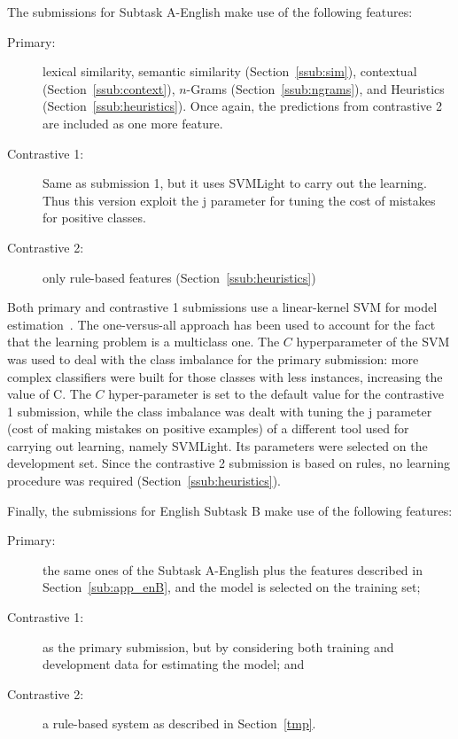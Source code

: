 The submissions for Subtask A-English make use of the following features: 
\begin{description}
\item[Primary:] 
  lexical similarity, semantic similarity (Section~\ref{ssub:sim}), contextual 
  (Section~\ref{ssub:context}), $n$-Grams (Section~\ref{ssub:ngrams}), and
  Heuristics (Section~\ref{ssub:heuristics}). Once again, the predictions from 
  contrastive 2 are included as one more feature. 
\item[Contrastive 1:] 
  Same as submission 1, but it uses SVMLight to carry out the learning. Thus 
  this version exploit the j parameter for tuning the cost of mistakes for 
  positive classes.
    
\item[Contrastive 2:] 
  only rule-based features 
(Section~\ref{ssub:heuristics}) 
\end{description}
% 
Both primary and contrastive 1 submissions use a linear-kernel SVM for model 
estimation~\cite{}. The one-versus-all approach has been used to account for the fact 
that the learning problem is a multiclass one. The $C$ hyperparameter of the SVM 
was used to deal with the class imbalance for the primary submission: more complex classifiers were built for those classes with less instances, increasing the value of C. The $C$ hyper-parameter is set to the default value for the contrastive 1 submission, while the class imbalance was dealt with tuning the j parameter (cost of making mistakes on positive examples) of a different tool used for carrying out learning, namely SVMLight. Its parameters 
were selected on the development set. Since the contrastive 2 submission is based on rules, no learning procedure was required (Section~\ref{ssub:heuristics}).

Finally, the submissions for English Subtask B make use of the following 
features:
\begin{description}
 \item[Primary:] the same ones of the Subtask A-English plus the features 
described in Section~\ref{sub:app_enB}, and the model is selected on the 
training set; 
 \item[Contrastive 1:] as the primary submission, but by considering both 
training and development data for estimating the model; and
 \item[Contrastive 2:] a rule-based system as described in 
Section~\ref{tmp}.
 \end{description}

